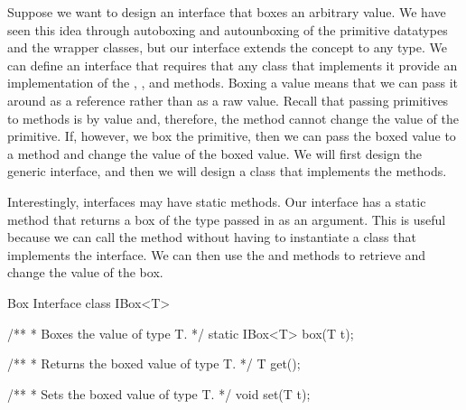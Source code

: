 \example Suppose we want to design an interface that boxes an arbitrary value. We have seen this idea through autoboxing and autounboxing of the primitive datatypes and the wrapper classes, but our interface extends the concept to any type. We can define an interface that requires that any class that implements it provide an implementation of the , , and  methods. Boxing a value means that we can pass it around as a reference rather than as a raw value. Recall that passing primitives to methods is by value and, therefore, the method cannot change the value of the primitive. If, however, we box the primitive, then we can pass the boxed value to a method and change the value of the boxed value. We will first design the generic  interface, and then we will design a class that implements the methods. 

Interestingly, interfaces may have static methods. Our  interface has a static  method that returns a box of the type passed in as an argument. This is useful because we can call the  method without having to instantiate a class that implements the  interface. We can then use the  and  methods to retrieve and change the value of the box.

\begin{cl}{Box Interface}
class IBox<T> {
  
    /**
     * Boxes the value of type T.
     */
    static IBox<T> box(T t);
  
    /**
     * Returns the boxed value of type T.
     */
    T get();
  
    /**
      * Sets the boxed value of type T.
      */
    void set(T t);
}
\end{cl}

